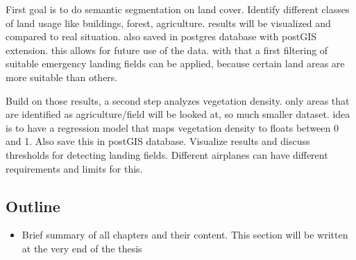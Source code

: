 First goal is to do semantic segmentation on land cover. Identify different classes of land usage like buildings, forest, agriculture. results will be visualized and compared to real situation. also saved in postgres database with postGIS extension. this allows for future use of the data. with that a first filtering of suitable emergency landing fields can be applied, because certain land areas are more suitable than others.

Build on those results, a second step analyzes vegetation density. only areas that are identified as  agriculture/field will be looked at, so much smaller dataset. idea is to have a regression model that maps vegetation density to floats between 0 and 1. Also save this in postGIS database. Visualize results and discuss thresholds for detecting landing fields. Different airplanes can have different requirements and limits for this.

\subsection{Outline}

\begin{itemize}
    \item Brief summary of all chapters and their content. This section will be written at the very end of the thesis
\end{itemize}

\newpage